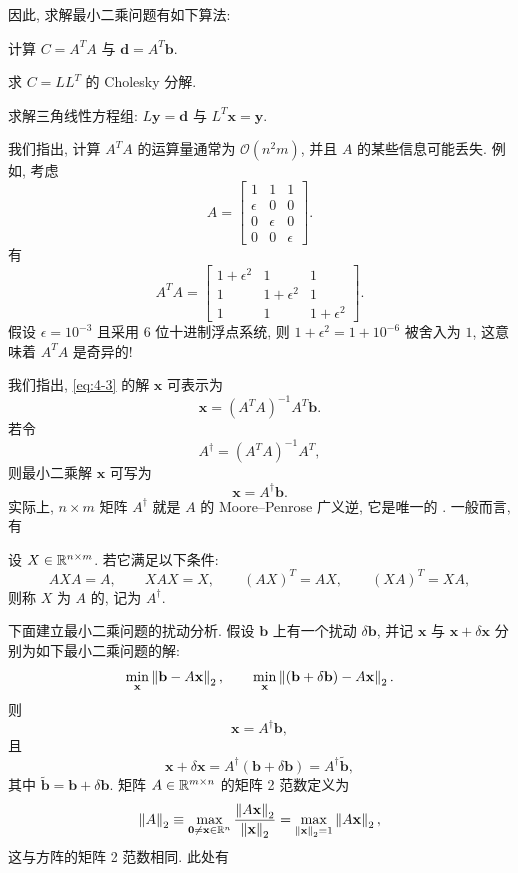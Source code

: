 因此, 求解最小二乘问题有如下算法:
\begin{parenlist}
  \item 计算 $C=A^TA$ 与 $\mathbf{d}=A^T\mathbf{b}$.
  \item 求 $C=LL^T$ 的 Cholesky 分解.
  \item 求解三角线性方程组: $L\mathbf{y}=\mathbf{d}$ 与 $L^T\mathbf{x}=\mathbf{y}$.
\end{parenlist}

我们指出, 计算 $A^TA$ 的运算量通常为 $\mathcal{O}(n^2m)$, 并且 $A$ 的某些信息可能丢失. 例如, 考虑
\[
  A=
  \begin{bmatrix}
    1 & 1 & 1\\
    \epsilon & 0 & 0\\
    0 & \epsilon & 0\\
    0 & 0 & \epsilon
  \end{bmatrix}.
\]
有
\[
  A^TA=
  \begin{bmatrix}
    1+\epsilon^2 & 1 & 1\\
    1 & 1+\epsilon^2 & 1\\
    1 & 1 & 1+\epsilon^2
  \end{bmatrix}.
\]
假设 $\epsilon=10^{-3}$ 且采用 6 位十进制浮点系统, 则 $1+\epsilon^2=1+10^{-6}$ 被舍入为 $1$, 这意味着 $A^TA$ 是奇异的!

我们指出, \eqref{eq:4-3} 的解 $\mathbf{x}$ 可表示为
\[
  \mathbf{x}=(A^TA)^{-1}A^T\mathbf{b}.
\]
若令
\[
  A^{\dagger}=(A^TA)^{-1}A^T,
\]
则最小二乘解 $\mathbf{x}$ 可写为
\[
  \mathbf{x}=A^{\dagger}\mathbf{b}.
\]
实际上, $n\times m$ 矩阵 $A^{\dagger}$ 就是 $A$ 的 Moore–Penrose 广义逆, 它是唯一的 \cite{src:30,src:39,src:88}. 一般而言, 有

\begin{definition}
\label{def:4-2}
设 $X\in\mathbb{R}^{n\times m}$. 若它满足以下条件:
\[
  AXA=A,\qquad XAX=X,\qquad (AX)^T=AX,\qquad (XA)^T=XA,
\]
则称 $X$ 为 $A$ 的, 记为 $A^{\dagger}$.
\end{definition}

下面建立最小二乘问题的扰动分析. 假设 $\mathbf{b}$ 上有一个扰动 $\delta\mathbf{b}$, 并记 $\mathbf{x}$ 与 $\mathbf{x}+\delta\mathbf{x}$ 分别为如下最小二乘问题的解:
\[
  \min_{\mathbf{x}}\left\|\mathbf{b}-A\mathbf{x}\right\|_2,
  \qquad
  \min_{\mathbf{x}}\left\|(\mathbf{b}+\delta\mathbf{b})-A\mathbf{x}\right\|_2.
\]
则
\[
  \mathbf{x}=A^{\dagger}\mathbf{b},
\]
且
\[
  \mathbf{x}+\delta\mathbf{x}
  =A^{\dagger}(\mathbf{b}+\delta\mathbf{b})=A^{\dagger}\tilde{\mathbf{b}},
\]
其中 $\tilde{\mathbf{b}}=\mathbf{b}+\delta\mathbf{b}$. 矩阵 $A\in\mathbb{R}^{m\times n}$ 的矩阵 2 范数定义为
\[
  \left\|A\right\|_2\equiv\max_{\mathbf{0}\neq\mathbf{x}\in\mathbb{R}^n}
  \frac{\left\|A\mathbf{x}\right\|_2}{\left\|\mathbf{x}\right\|_2}
  =\max_{\left\|\mathbf{x}\right\|_2=1}\left\|A\mathbf{x}\right\|_2,
\]
这与方阵的矩阵 2 范数相同. 此处有

